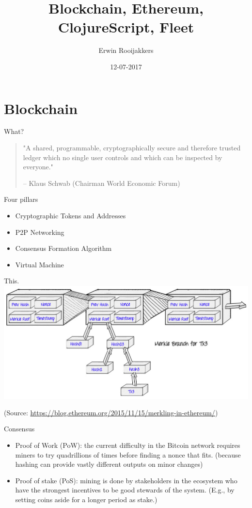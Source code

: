 \documentclass[presentation]{beamer}
\author{Erwin Rooijakkers}
\date{12-07-2017}
\title{Blockchain, Ethereum, ClojureScript, Fleet}
\begin{document}
\maketitle

\section{Blockchain}
\label{sec-1}

\begin{frame}[label=sec-1-1]{What?}
\begin{quotation}
"A \alert{shared}, programmable, cryptographically secure and therefore trusted ledger
\alert{which no single user controls} and \alert{which can be inspected by everyone}."

-- Klaus Schwab (Chairman World Economic Forum)
\end{quotation}
\end{frame}

\begin{frame}[label=sec-1-2]{Four pillars}
\begin{itemize}
\item Cryptographic Tokens and Addresses
\item P2P Networking
\item Consensus Formation Algorithm
\item Virtual Machine
\end{itemize}
\end{frame}

\begin{frame}[label=sec-1-3]{This.}
\includegraphics[width=.9\linewidth]{../images/merkle.jpg}

(Source: \url{https://blog.ethereum.org/2015/11/15/merkling-in-ethereum/})
\end{frame}

\begin{frame}[label=sec-1-4]{Consensus}
\begin{itemize}
\item \alert{Proof of Work (PoW)}: the current difficulty in the Bitcoin network requires
miners to try quadrillions of times before finding a nonce that fits.
(because \alert{hashing} can provide vastly different outputs on minor changes)
\item \alert{Proof of stake (PoS)}: mining is done by stakeholders in the ecosystem who
have the strongest incentives to be good stewards of the system. (E.g., by
setting coins aside for a longer period as stake.)
\end{itemize}
\end{frame}
\end{document}
